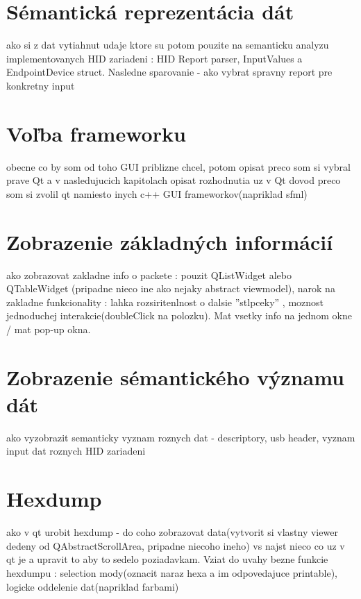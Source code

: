 \section{Sémantická reprezentácia dát}
ako si z dat vytiahnut udaje ktore su potom pouzite na semanticku analyzu implementovanych HID zariadeni : HID Report parser, InputValues a EndpointDevice struct.
Nasledne sparovanie - ako vybrat spravny report pre konkretny input
\section{Voľba frameworku}
obecne co by som od toho GUI priblizne chcel, potom opisat preco som si vybral prave Qt a v nasledujucich kapitolach opisat rozhodnutia uz v Qt
dovod preco som si zvolil qt namiesto inych c++ GUI frameworkov(napriklad sfml)
\section{Zobrazenie základných informácií}
ako zobrazovat zakladne info o packete : pouzit QListWidget alebo QTableWidget (pripadne nieco ine ako nejaky abstract viewmodel), narok na zakladne funkcionality : lahka rozsiritenlnost o dalsie ''stlpceky'' , moznost jednoduchej interakcie(doubleClick na polozku). Mat vsetky info na jednom okne / mat pop-up okna.
\section{Zobrazenie sémantického významu dát}
ako vyzobrazit semanticky vyznam roznych dat - descriptory, usb header, vyznam input dat roznych HID zariadeni
\section{Hexdump}
ako v qt urobit hexdump - do coho zobrazovat data(vytvorit si vlastny viewer dedeny od QAbstractScrollArea, pripadne niecoho ineho) vs najst nieco co uz v qt je a upravit to aby to sedelo poziadavkam. Vziat do uvahy bezne funkcie hexdumpu : selection mody(oznacit naraz hexa a im odpovedajuce printable), logicke oddelenie dat(napriklad farbami)








